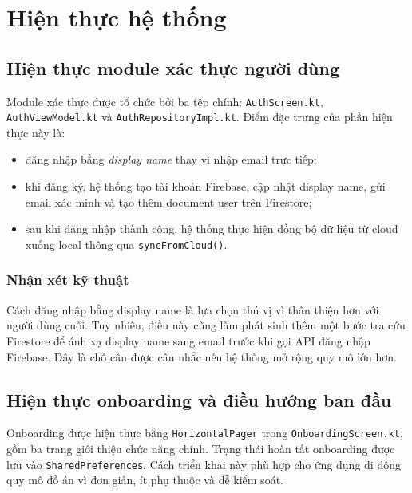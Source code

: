 \documentclass{zenbuddy-report}
\begin{document}
\chapter{Hiện thực hệ thống}

\section{Hiện thực module xác thực người dùng}
Module xác thực được tổ chức bởi ba tệp chính: \texttt{AuthScreen.kt}, \texttt{AuthViewModel.kt} và \texttt{AuthRepositoryImpl.kt}. Điểm đặc trưng của phần hiện thực này là:
\begin{itemize}
  \item đăng nhập bằng \textit{display name} thay vì nhập email trực tiếp;
  \item khi đăng ký, hệ thống tạo tài khoản Firebase, cập nhật display name, gửi email xác minh và tạo thêm document user trên Firestore;
  \item sau khi đăng nhập thành công, hệ thống thực hiện đồng bộ dữ liệu từ cloud xuống local thông qua \texttt{syncFromCloud()}.
\end{itemize}


\subsection{Nhận xét kỹ thuật}
Cách đăng nhập bằng display name là lựa chọn thú vị vì thân thiện hơn với người dùng cuối. Tuy nhiên, điều này cũng làm phát sinh thêm một bước tra cứu Firestore để ánh xạ display name sang email trước khi gọi API đăng nhập Firebase. Đây là chỗ cần được cân nhắc nếu hệ thống mở rộng quy mô lớn hơn.

\section{Hiện thực onboarding và điều hướng ban đầu}
Onboarding được hiện thực bằng \texttt{HorizontalPager} trong \texttt{OnboardingScreen.kt}, gồm ba trang giới thiệu chức năng chính. Trạng thái hoàn tất onboarding được lưu vào \texttt{SharedPreferences}. Cách triển khai này phù hợp cho ứng dụng di động quy mô đồ án vì đơn giản, ít phụ thuộc và dễ kiểm soát.

\end{document}
